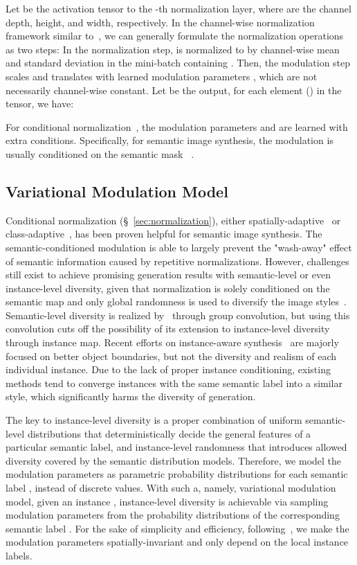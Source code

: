 \documentclass[final]{cvpr}
\begin{document}
Let  be the activation tensor to the -th normalization layer, where  are the channel depth, height, and width, respectively. In the channel-wise normalization framework similar to~\cite{ioffe2015batch}, we can generally formulate the normalization operations as two steps: In the normalization step,  is normalized to  by channel-wise mean and standard deviation  in the mini-batch containing . Then, the modulation step scales and translates  with learned modulation parameters , which are not necessarily channel-wise constant. Let  be the output, for each element () in the tensor, we have:


For conditional normalization~\cite{dumoulin2016learned,huang2017arbitrary}, the modulation parameters  and  are learned with extra conditions. Specifically, for semantic image synthesis, the modulation is usually conditioned on the semantic mask ~\cite{park2019semantic,tan2020semantic}.

\subsection{Variational Modulation Model}
\label{sec:model}
Conditional normalization (\S~\ref{sec:normalization}), either spatially-adaptive~\cite{park2019semantic} or class-adaptive~\cite{tan2020semantic}, has been proven helpful for semantic image synthesis. The semantic-conditioned modulation is able to largely prevent the "wash-away" effect of semantic information caused by repetitive normalizations. However, challenges still exist to achieve promising generation results with semantic-level or even instance-level diversity, given that normalization is solely conditioned on the semantic map and only global randomness is used to diversify the image styles~\cite{park2019semantic}. Semantic-level diversity is realized by~\cite{zhu2020semantically} through group convolution, but using this convolution cuts off the possibility of its extension to instance-level diversity through instance map.
Recent efforts on instance-aware synthesis~\cite{wang2018high,dundar2020panoptic} are majorly focused on better object boundaries, but not the diversity and realism of each individual instance. Due to the lack of proper instance conditioning, existing methods tend to converge instances with the same semantic label into a similar style, which significantly harms the diversity of generation. 

The key to instance-level diversity is a proper combination of uniform semantic-level distributions that deterministically decide the general features of a particular semantic label, and instance-level randomness that introduces allowed diversity covered by the semantic distribution models. Therefore, we model the modulation parameters as parametric probability distributions for each semantic label , instead of discrete values. With such a, namely, variational modulation model, given an instance , instance-level diversity is achievable via sampling modulation parameters from the probability distributions of the corresponding semantic label . For the sake of simplicity and efficiency, following~\cite{tan2020semantic}, we make the modulation parameters spatially-invariant and only depend on the local instance labels.
\end{document}
